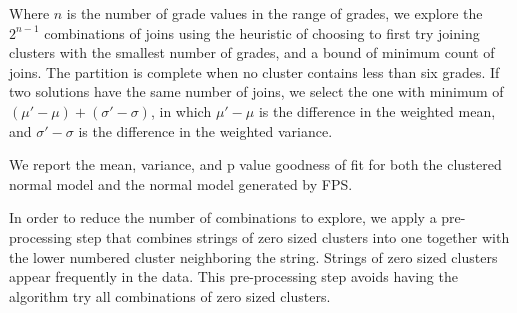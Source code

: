 Where $n$ is the number of grade values in the range of grades,
we explore the $2^{n-1}$ combinations of joins using the heuristic
of choosing to first try joining clusters with the smallest number of grades,
and a bound of minimum count of joins. The partition
is complete when no cluster contains less than six grades. If two solutions
have the same number of joins, we select the one with minimum of
$(\mu' - \mu) + (\sigma' - \sigma)$, in which
$\mu' - \mu$ is
the difference in the weighted mean, and
$\sigma' - \sigma$ is
the difference in the weighted variance.

We report the mean, variance, and p value goodness of fit
for both the clustered normal model and the normal model generated by FPS.

In order to reduce the number of combinations to explore, we apply a
pre-processing step that combines strings of zero sized clusters into
one together with the lower numbered cluster neighboring the string.
Strings of zero sized clusters appear frequently in the data.
This pre-processing step
avoids having the algorithm try all combinations of zero sized clusters.
